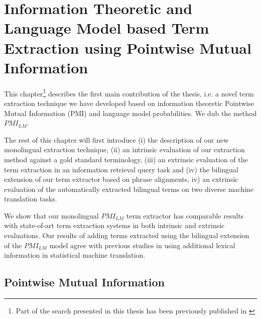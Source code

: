 \chapter{Information Theoretic and Language Model based Term Extraction using Pointwise Mutual Information}
\label{chap:lmpmi}

This chapter\footnote{Part of the search presented in this thesis has been previously published in \cite{lilingexperttechreport,lilingexpertworkshop}} describes the first main contribution of the thesis, i.e. a novel term extraction technique we have developed based on information theoretic Pointwise Mutual Information (PMI) and language model probabilities. We dub the method $PMI_{LM}$.

The rest of this chapter will first introduce (i) the description of our new monolingual extraction technique, (ii) an intrinsic evaluation of our extraction method against a gold standard terminology, (iii) an extrinsic evaluation of the term extraction in an information retrieval query task and (iv) the bilingual extension of our term extractor based on phrase alignments, iv) an extrinsic evaluation of the automatically extracted bilingual terms on two diverse machine translation tasks.

We show that our monolingual $PMI_{LM}$ term extractor has comparable results with state-of-art term extraction systems in both intrinsic and extrinsic evaluations. Our results of adding terms extracted using the bilingual extension of the $PMI_{LM}$ model agree with previous studies in using additional lexical information in statistical machine translation.

\section{Pointwise Mutual Information}

